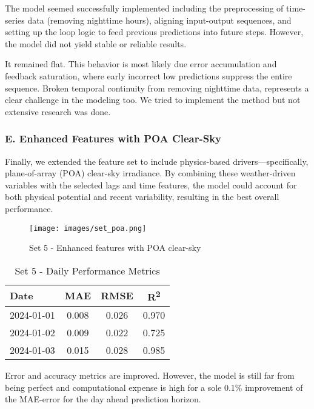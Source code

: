 The model seemed successfully implemented including the preprocessing of time-series 
data (removing nighttime hours), aligning input-output sequences, and setting up the loop 
logic to feed previous predictions into future steps. However, the model did not yield 
stable or reliable results. 

It remained flat. This behavior is most likely due error accumulation and feedback saturation, 
where early incorrect low predictions suppress the entire sequence. Broken temporal continuity 
from removing nighttime data, represents a clear challenge in the modeling too. We tried to 
implement the method but not extensive research was done.  

\subsubsection*{E. Enhanced Features with POA Clear-Sky}
Finally, we extended the feature set to include physics-based drivers—specifically, 
plane-of-array (POA) clear-sky irradiance. By combining these weather-driven variables 
with the selected lags and time features, the model could account for both physical 
potential and recent variability, resulting in the best overall performance.

\begin{figure}[H]
    \centering
    \texttt{[image: images/set\_poa.png]}
    \caption{Set 5 - Enhanced features with POA clear-sky}
    \label{fig:set5-forecast-profile}
\end{figure}

\begin{table}[H]
    \centering
    \begin{tabular}{lccc}
        Date        & MAE    & RMSE   & R\textsuperscript{2} \\
        \hline
        2024-01-01  & 0.008  & 0.026  & 0.970 \\
        2024-01-02  & 0.009  & 0.022  & 0.725 \\
        2024-01-03  & 0.015  & 0.028  & 0.985 \\
    \end{tabular}
    \caption{Set 5 - Daily Performance Metrics}
\end{table}

Error and accuracy metrics are improved. However, the model is still far from being perfect 
and computational expense is high for a sole 0.1\% improvement of the MAE-error for the day ahead 
prediction horizon. 

